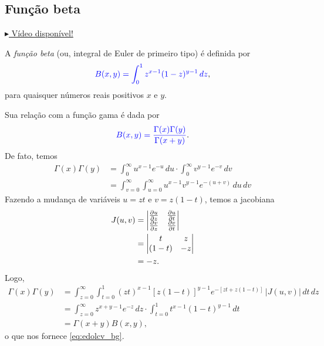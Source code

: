 \subsection{Função beta}

\begin{flushright}
  \href{https://archive.org/details/funcao-beta}{$\blacktriangleright$ Vídeo disponível!}
\end{flushright}

A \emph{função beta} (ou, integral de Euler de primeiro tipo) é definida por
\begin{equation}
  {\color{blue}B(x,y) = \int_0^1 z^{x-1}(1-z)^{y-1}\,dz},
\end{equation}
para quaisquer números reais positivos $x$ e $y$.

Sua relação com a função gama é dada por
\begin{equation}\label{eq:edolcv_bg}
  {\color{blue}B(x,y) = \frac{\Gamma(x)\Gamma(y)}{\Gamma(x+y)}}.
\end{equation}
De fato, temos
\begin{align}
  \Gamma(x)\Gamma(y) &= \int_0^\infty u^{x-1}e^{-u}\,du\cdot\int_0^\infty v^{y-1}e^{-v}\,dv \\
                     &= \int_{v=0}^\infty\int_{u=0}^\infty u^{x-1}v^{y-1}e^{-(u+v)}\,du\,dv
\end{align}
Fazendo a mudança de variáveis $u=zt$ e $v=z(1-t)$, temos a jacobiana
\begin{align}
  J(u,v) &=
           \begin{vmatrix}
             \frac{\partial u}{\partial z} & \frac{\partial u}{\partial t}\\
             \frac{\partial v}{\partial z} & \frac{\partial v}{\partial t}
           \end{vmatrix}\\
         &= \begin{vmatrix}
           t & z\\
           (1-t) & -z
         \end{vmatrix}\\
         &= -z.
\end{align}
Logo,
\begin{align}
  \Gamma(x)\Gamma(y) &= \int_{z=0}^\infty\int_{t=0}^1 (zt)^{x-1}[z(1-t)]^{y-1}e^{-[zt+z(1-t)]}\,|J(u,v)|\,dt\,dz\\
                     &= \int_{z=0}^\infty z^{x+y-1}e^{-z}\,dz\cdot \int_{t=0}^1 t^{x-1}(1-t)^{y-1}\,dt\\
                     &= \Gamma(x+y) B(x,y),
\end{align}
o que nos fornece \eqref{eq:edolcv_bg}.


